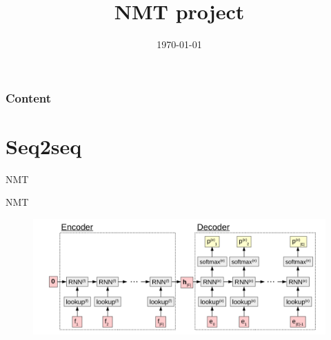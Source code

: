 \documentclass[xcolor=pdftex,dvipsnames,table]{beamer}
\begin{document}
	\title{NMT project}


	\date{\today}
	
	{
	\begin{frame}[plain]
		\titlepage
	\end{frame}
	}


	{
	\begin{frame}
		\frametitle{Content}
		\tableofcontents
	\end{frame}
	}



	\setcounter{framenumber}{0}


	\section{Seq2seq}
	\begin{frame}{NMT}


	\end{frame}
	
	\begin{frame}{NMT}
	\begin{figure}
	\includegraphics[scale=0.45]{img/encdec}

	\end{figure}
	\end{frame}
	
\end{document}
